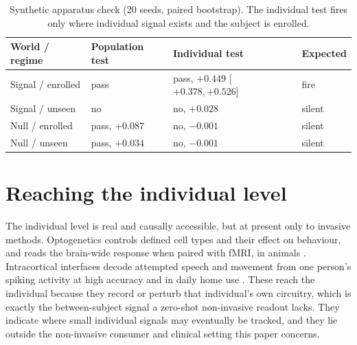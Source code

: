 \documentclass{article}
\begin{document}
\begin{table}[t]
\centering\small
\caption{Synthetic apparatus check (20 seeds, paired bootstrap). The individual test fires only where
individual signal exists and the subject is enrolled.}
\label{tab:gates}
\begin{tabular}{@{}llll@{}}
\toprule
World / regime & Population test & Individual test & Expected \\
\midrule
Signal / enrolled & pass & pass, $+0.449$ [$+0.378,+0.526$] & fire \\
Signal / unseen & no & no, $+0.028$ & silent \\
Null / enrolled & pass, $+0.087$ & no, $-0.001$ & silent \\
Null / unseen & pass, $+0.034$ & no, $-0.001$ & silent \\
\bottomrule
\end{tabular}
\end{table}

\section{Reaching the individual level}
\label{sec:invasive}
The individual level is real and causally accessible, but at present only to invasive methods. Optogenetics
controls defined cell types and their effect on behaviour, and reads the brain-wide response when paired
with fMRI, in animals \citep{zhao2011,bernalcasas2017}. Intracortical interfaces decode attempted speech and
movement from one person's spiking activity at high accuracy and in daily home use
\citep{willett2023,card2025,silva2024}. These reach the individual because they record or perturb that
individual's own circuitry, which is exactly the between-subject signal a zero-shot non-invasive readout
lacks. They indicate where small individual signals may eventually be tracked, and they lie outside the
non-invasive consumer and clinical setting this paper concerns.
\end{document}
